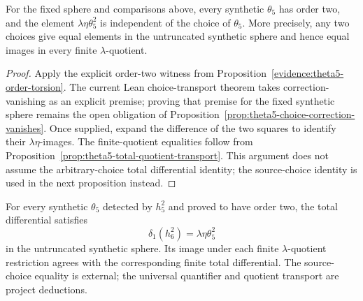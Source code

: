 \begin{proposition}
  \label{prop:theta5-choice-independence}
  \notready
  For the fixed sphere and comparisons above, every synthetic $\theta_5$ has order
  two, and the element
  $\lambda\eta\theta_5^2$ is independent of the choice of $\theta_5$.
  More precisely, any two choices give equal elements in the untruncated
  synthetic sphere and hence equal images in every finite $\lambda$-quotient.
\end{proposition}

\begin{proof}
  Apply the explicit order-two witness from
  Proposition~\ref{evidence:theta5-order-torsion}.  The current Lean
  choice-transport theorem takes correction-vanishing as an explicit premise;
  proving that premise for the fixed synthetic sphere remains the open
  obligation of Proposition~\ref{prop:theta5-choice-correction-vanishes}.
  Once supplied, expand the difference of the two squares to identify their
  $\lambda\eta$-images.  The finite-quotient equalities follow from
  Proposition~\ref{prop:theta5-total-quotient-transport}.  This argument
  does not assume the arbitrary-choice total differential identity; the
  source-choice identity is used in the next proposition instead.
\end{proof}

\begin{proposition}
  \label{prop:theta5-total-differential-any-choice}
  \notready
  For every synthetic $\theta_5$ detected by $h_5^2$ and proved to have order
  two, the total differential satisfies
  \[
    \delta_1(h_6^2)=\lambda\eta\theta_5^2
  \]
  in the untruncated synthetic sphere.  Its image under each finite
  $\lambda$-quotient restriction agrees with the corresponding finite total
  differential.  The source-choice equality is external; the universal
  quantifier and quotient transport are project deductions.
\end{proposition}

